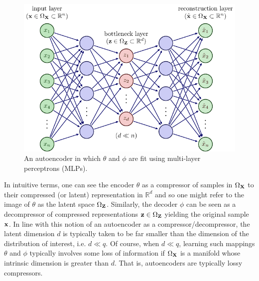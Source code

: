 \documentclass[11pt]{article}
\begin{document}
\begin{figure}[t]
    \centering
    \includegraphics{./figures/neural_nets/AE_autoencoder.pdf}
    \caption{An autoencoder in which $\theta$ and $\phi$ are fit using multi-layer perceptrons (MLPs). }
    \label{fig:autoencoder}
\end{figure}

In intuitive terms, one can see the encoder $\theta$ as a compressor of samples in $\Omega_{\mathbf{X}}$ to their compressed (or latent) representation in $\mathbb{R}^d$ and so one might refer to the image of $\theta$ as the latent space $\Omega_{\mathbf{Z}}$. Similarly, the decoder $\phi$ can be seen as a decompressor of compressed representations $\mathbf{z}\in\Omega_{\mathbf{Z}}$ yielding the original sample $\mathbf{x}$. In line with this notion of an autoencoder as a compressor/decompressor, the latent dimension $d$ is typically taken to be far smaller than the dimension of the distribution of interest, i.e. $d\ll q$. Of course, when $d\ll q$, learning such mappings $\theta$ and $\phi$ typically involves some loss of information if $\Omega_{\mathbf{X}}$ is a manifold whose intrinsic dimension is greater than $d$. That is, autoencoders are typically lossy compressors.
\end{document}
